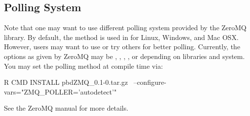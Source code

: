 \subsection{Polling System}

Note that one may want to use different polling system provided by 
the ZeroMQ library.  By default, the  method is used in 
 for Linux, Windows, and Mac OSX. However, users may want to use 
 or try others for better polling. Currently, the options as 
given by ZeroMQ may be , , , 
, or  depending on libraries and system. You may set 
the polling method at compile time via:
\begin{Command}
R CMD INSTALL pbdZMQ_0.1-0.tar.gz \
  --configure-vars="ZMQ_POLLER='autodetect'"
\end{Command}
See the ZeroMQ manual for more details.
